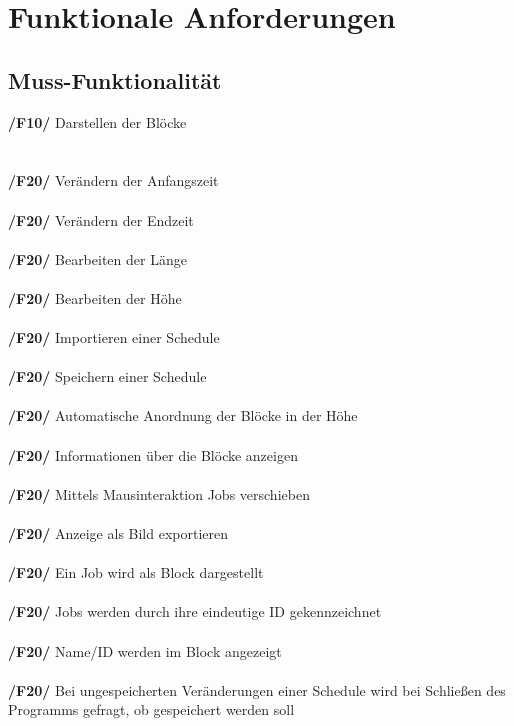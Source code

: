 \documentclass[parskip=full]{scrartcl}
\begin{document}
	\section{Funktionale Anforderungen}
		\subsection{Muss-Funktionalität}
			
			
			\textbf{/F10/} Darstellen der Blöcke\\\\\\
			\textbf{/F20/} Verändern der Anfangszeit\\\\
			\textbf{/F20/} Verändern der Endzeit\\\\
			\textbf{/F20/} Bearbeiten der Länge\\\\
			\textbf{/F20/} Bearbeiten der Höhe\\\\
			\textbf{/F20/} Importieren einer Schedule\\\\
			\textbf{/F20/} Speichern einer Schedule\\\\
			\textbf{/F20/} Automatische Anordnung der Blöcke in der Höhe\\\\
			\textbf{/F20/} Informationen über die Blöcke anzeigen\\\\
			\textbf{/F20/} Mittels Mausinteraktion Jobs verschieben\\\\
			\textbf{/F20/} Anzeige als Bild exportieren\\\\				
			\textbf{/F20/} Ein Job wird als Block dargestellt\\\\
		\textbf{/F20/} Jobs werden durch ihre eindeutige ID gekennzeichnet\\\\
		\textbf{/F20/} Name/ID werden im Block angezeigt\\\\			
		\textbf{/F20/} Bei ungespeicherten Veränderungen einer Schedule wird bei Schließen des Programms gefragt, ob gespeichert werden soll\\\\			
		
\end{document}
